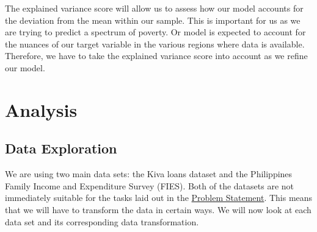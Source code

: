 \documentclass{article}
\begin{document}
The explained variance score will allow us to assess how our model accounts for the deviation from the mean within our sample. This is important for us as we are trying to predict a spectrum of poverty. Or model is expected to account for the nuances of our target variable in the various regions where data is available. Therefore, we have to take the explained variance score into account as we refine our model.

\section{Analysis}
\subsection{Data Exploration}
We are using two main data sets: the Kiva loans dataset and the Philippines Family Income and Expenditure Survey (FIES). Both of the datasets are not immediately suitable for the tasks laid out in the \hyperlink{prob_statement}{Problem Statement}. This means that we will have to transform the data in certain ways. We will now look at each data set and its corresponding data transformation.
\end{document}

